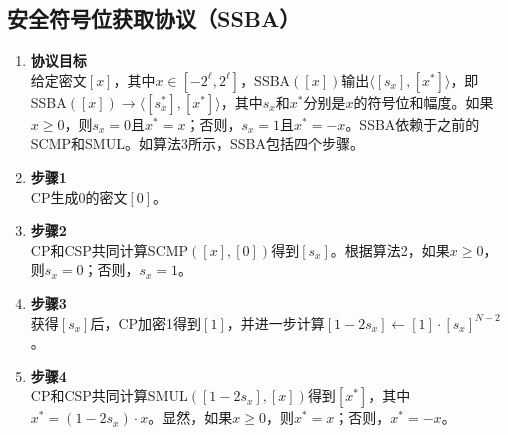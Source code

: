 \subsection{安全符号位获取协议（SSBA）}
\begin{enumerate}[leftmargin=*, nosep]
    \item \textbf{协议目标}  \\
    给定密文\([x]\)，其中\( x\in[-2^{\ell},2^{\ell}] \)，SSBA\(([x])\)输出\(\langle[s_{x}],[x^{*}]\rangle\)，即SSBA\(([x])\rightarrow\langle[s_{x}^{*}],[x^{*}]\rangle\)，其中\( s_{x} \)和\( x^{*} \)分别是\( x \)的符号位和幅度。如果\( x \geq 0 \)，则\( s_{x} = 0 \)且\( x^{*} = x \)；否则，\( s_{x} = 1 \)且\( x^{*} = -x \)。SSBA依赖于之前的SCMP和SMUL。如算法3所示，SSBA包括四个步骤。
    \item \textbf{步骤1}  \\
    CP生成0的密文\([0]\)。
    \item \textbf{步骤2}  \\
    CP和CSP共同计算SCMP\(([x],[0])\)得到\([s_{x}]\)。根据算法2，如果\( x \geq 0 \)，则\( s_{x} = 0 \)；否则，\( s_{x} = 1 \)。
    \item \textbf{步骤3}  \\
    获得\([s_{x}]\)后，CP加密1得到\([1]\)，并进一步计算\([1-2s_{x}]\leftarrow[1]\cdot[s_{x}]^{N-2}\)。
    \item \textbf{步骤4}  \\
    CP和CSP共同计算SMUL\(([1-2s_{x}],[x])\)得到\([x^{*}]\)，其中\( x^{*} = (1-2s_{x}) \cdot x \)。显然，如果\( x \geq 0 \)，则\( x^{*} = x \)；否则，\( x^{*} = -x \)。
\end{enumerate}

